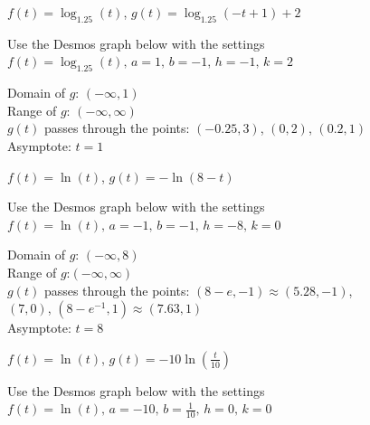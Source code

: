 \documentclass{ximera}
\begin{document}
\begin{question}
\begin{problem}
$f(t) = \log_{1.25}(t)$, $g(t) = \log_{1.25}(-t+1) + 2$

\begin{solution}
Use the Desmos graph below with the settings $f(t) = \log_{1.25}(t),\,a=1,\,b=-1,\,h=-1,\,k=2$

\begin{center} 
\end{center}

 Domain of $g$: $(-\infty, 1)$ \\
  Range of $g$: $(-\infty, \infty)$  \\
 $g(t)$ passes through the points:  $(-0.25,3)$,  $(0,2)$, $(0.2,1)$ \\
  Asymptote: $t = 1$\\
\end{solution}
\end{problem}

\begin{problem}
$f(t) = \ln(t)$, $g(t) = -\ln(8-t)$

\begin{solution}
Use the Desmos graph below with the settings $f(t) = \ln(t),\,a=-1,\,b=-1,\,h=-8,\,k=0$

\begin{center} 
\end{center}

Domain of $g$:  $(-\infty, 8)$\\
 Range of $g$:$(-\infty, \infty)$\\
 $g(t)$ passes through the points:  $(8-e, -1) \approx (5.28, -1)$,\\
 $(7,0)$, $(8 - e^{-1}, 1) \approx (7.63,1)$ \\
 Asymptote:  $t = 8$ \\
\end{solution}
\end{problem}

\begin{problem}\label{graphloglast}
$f(t) = \ln(t)$, $g(t) = -10\ln\left(\frac{t}{10}\right)$

\begin{solution}
Use the Desmos graph below with the settings $f(t) = \ln(t),\,a=-10,\,b=\frac{1}{10},\,h=0,\,k=0$

\begin{center} 
\end{center}


\end{solution}
\end{problem}
\end{question}
\end{document}
